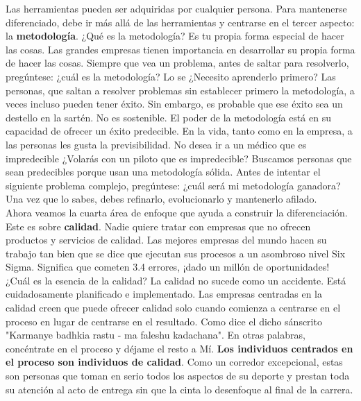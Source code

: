 \documentclass[10pt]{book}
\begin{document}
Las herramientas pueden ser adquiridas por cualquier persona. Para mantenerse diferenciado, debe ir más allá de las herramientas y centrarse en el tercer aspecto: la \textbf{metodología}. ¿Qué es la metodología? Es tu propia forma especial de hacer las cosas. Las grandes empresas tienen importancia en desarrollar su propia forma de hacer las cosas. Siempre que vea un problema, antes de saltar para resolverlo, pregúntese: ¿cuál es la metodología? Lo se ¿Necesito aprenderlo primero? Las personas, que saltan a resolver problemas sin establecer primero la metodología, a veces incluso pueden tener éxito. Sin embargo, es probable que ese éxito sea un destello en la sartén. No es sostenible. El poder de la metodología está en su capacidad de ofrecer un éxito predecible. En la vida, tanto como en la empresa, a las personas les gusta la previsibilidad. No desea ir a un médico que es impredecible ¿Volarás con un piloto que es impredecible? Buscamos personas que sean predecibles porque usan una metodología sólida. Antes de intentar el siguiente problema complejo, pregúntese: ¿cuál será mi metodología ganadora? Una vez que lo sabes, debes refinarlo, evolucionarlo y mantenerlo afilado.\\
Ahora veamos la cuarta área de enfoque que ayuda a construir la diferenciación. Este es sobre \textbf{calidad}. Nadie quiere tratar con empresas que no ofrecen productos y servicios de calidad. Las mejores empresas del mundo hacen su trabajo tan bien que se dice que ejecutan sus procesos a un asombroso nivel Six Sigma. Significa que cometen 3.4 errores, ¡dado un millón de oportunidades! ¿Cuál es la esencia de la calidad? La calidad no sucede como un accidente. Está cuidadosamente planificado e implementado. Las empresas centradas en la calidad creen que puede ofrecer calidad solo cuando comienza a centrarse en el proceso en lugar de centrarse en el resultado. Como dice el dicho sánscrito "Karmanye badhkia rastu - ma faleshu kadachana". En otras palabras, concéntrate en el proceso y déjame el resto a Mí. \textbf{Los individuos centrados en el proceso son individuos de calidad}. Como un corredor excepcional, estas son personas que toman en serio todos los aspectos de su deporte y prestan toda su atención al acto de entrega sin que la cinta lo desenfoque al final de la carrera.\\
\end{document}
